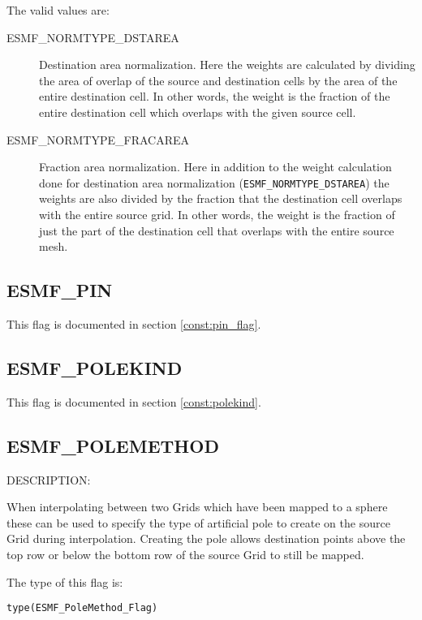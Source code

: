 The valid values are:
 \begin{description}
\item [ESMF\_NORMTYPE\_DSTAREA]
 Destination area normalization. Here the weights are calculated by dividing the area of overlap of the source and 
 destination cells by the area of the entire destination cell. In other words, the weight is the fraction of the 
 entire destination cell which overlaps with the given source cell. 
\item [ESMF\_NORMTYPE\_FRACAREA]
   Fraction area normalization. Here in addition to the weight calculation done for destination area normalization 
({\tt ESMF\_NORMTYPE\_DSTAREA}) the weights are also divided by the fraction that the destination cell overlaps with
  the entire source grid. In other words, the weight is the fraction of just the part of the destination cell that 
  overlaps with the entire source mesh.  
\end{description}


\subsection{ESMF\_PIN}
This flag is documented in section \ref{const:pin_flag}.

\subsection{ESMF\_POLEKIND}
This flag is documented in section \ref{const:polekind}.

\subsection{ESMF\_POLEMETHOD}
\label{const:polemethod}

{\sf DESCRIPTION:\\}  
\begin{sloppypar}
When interpolating between two Grids which have been mapped to a sphere these can be used to specify the type of artificial pole to create on the source Grid during interpolation. Creating the pole allows destination points above the top row or below the bottom row of the source Grid to still be mapped.
\end{sloppypar}

The type of this flag is:

{\tt type(ESMF\_PoleMethod\_Flag)}

